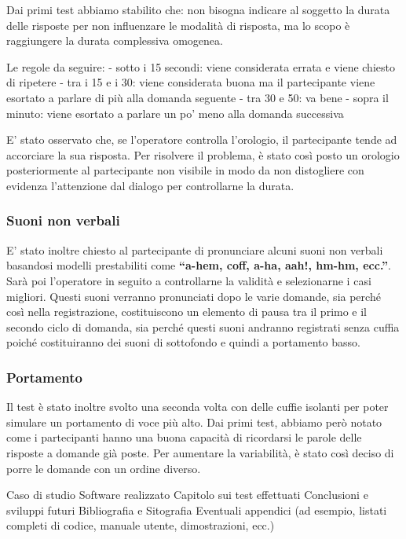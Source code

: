 \documentclass[
]{article}
\begin{document}
Dai primi test abbiamo stabilito che: non bisogna indicare al soggetto la durata delle risposte per non influenzare le modalità di risposta, ma lo scopo è raggiungere la durata complessiva omogenea.

Le regole da seguire: - sotto i 15 secondi: viene considerata errata e viene chiesto di ripetere - tra i 15 e i 30: viene considerata buona ma il partecipante viene esortato a parlare di più alla domanda seguente - tra 30 e 50: va bene - sopra il minuto: viene esortato a parlare un po' meno alla domanda successiva

E' stato osservato che, se l'operatore controlla l'orologio, il partecipante tende ad accorciare la sua risposta. Per risolvere il problema, è stato così posto un orologio posteriormente al partecipante non visibile in modo da non distogliere con evidenza l'attenzione dal dialogo per controllarne la durata.

\subsubsection{Suoni non verbali}\label{suoni-non-verbali}

E' stato inoltre chiesto al partecipante di pronunciare alcuni suoni non verbali basandosi modelli prestabiliti come \textbf{``a-hem, coff, a-ha, aah!, hm-hm, ecc.''}. Sarà poi l'operatore in seguito a controllarne la validità e selezionarne i casi migliori. Questi suoni verranno pronunciati dopo le varie domande, sia perché così nella registrazione, costituiscono un elemento di pausa tra il primo e il secondo ciclo di domanda, sia perché questi suoni andranno registrati senza cuffia poiché costituiranno dei suoni di sottofondo e quindi a portamento basso.

\subsubsection{Portamento}\label{portamento}

Il test è stato inoltre svolto una seconda volta con delle cuffie isolanti per poter simulare un portamento di voce più alto. Dai primi test, abbiamo però notato come i partecipanti hanno una buona capacità di ricordarsi le parole delle risposte a domande già poste. Per aumentare la variabilità, è stato così deciso di porre le domande con un ordine diverso.

Caso di studio Software realizzato Capitolo sui test effettuati Conclusioni e sviluppi futuri Bibliografia e Sitografia Eventuali appendici (ad esempio, listati completi di codice, manuale utente, dimostrazioni, ecc.)
\end{document}
